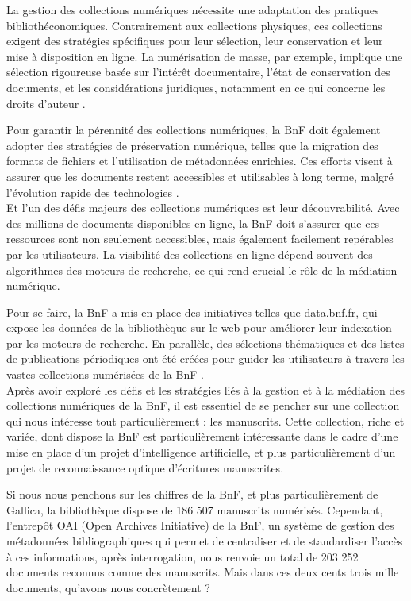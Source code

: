 \documentclass[a4paper,12pt,twoside]{book}
\begin{document}
	La gestion des collections numériques nécessite une adaptation des pratiques bibliothéconomiques. Contrairement aux collections physiques, ces collections exigent des stratégies spécifiques pour leur sélection, leur conservation et leur mise à disposition en ligne. La numérisation de masse, par exemple, implique une sélection rigoureuse basée sur l’intérêt documentaire, l’état de conservation des documents, et les considérations juridiques, notamment en ce qui concerne les droits d’auteur .
	
	Pour garantir la pérennité des collections numériques, la BnF doit également adopter des stratégies de préservation numérique, telles que la migration des formats de fichiers et l’utilisation de métadonnées enrichies. Ces efforts visent à assurer que les documents restent accessibles et utilisables à long terme, malgré l’évolution rapide des technologies .
	\\
	
	Et l’un des défis majeurs des collections numériques est leur découvrabilité. Avec des millions de documents disponibles en ligne, la BnF doit s’assurer que ces ressources sont non seulement accessibles, mais également facilement repérables par les utilisateurs. La visibilité des collections en ligne dépend souvent des algorithmes des moteurs de recherche, ce qui rend crucial le rôle de la médiation numérique.
	
	Pour se faire, la BnF a mis en place des initiatives telles que data.bnf.fr, qui expose les données de la bibliothèque sur le web pour améliorer leur indexation par les moteurs de recherche. En parallèle, des sélections thématiques et des listes de publications périodiques ont été créées pour guider les utilisateurs à travers les vastes collections numérisées de la BnF .
	\\
	
	Après avoir exploré les défis et les stratégies liés à la gestion et à la médiation des collections numériques de la BnF, il est essentiel de se pencher sur une collection qui nous intéresse tout particulièrement : les manuscrits. Cette collection, riche et variée, dont dispose la BnF est particulièrement intéressante dans le cadre d’une mise en place d’un projet d’intelligence artificielle, et plus particulièrement d’un projet de reconnaissance optique d’écritures manuscrites. 
	
	Si nous nous penchons sur les chiffres de la BnF, et plus particulièrement de Gallica, la bibliothèque dispose de 186 507 manuscrits numérisés. Cependant, l’entrepôt OAI  (Open Archives Initiative) de la BnF, un système de gestion des métadonnées bibliographiques qui permet de centraliser et de standardiser l’accès à ces informations, après interrogation, nous renvoie un total de 203 252 documents reconnus comme des manuscrits. Mais dans ces deux cents trois mille documents, qu’avons nous concrètement ? 
	
\end{document}

